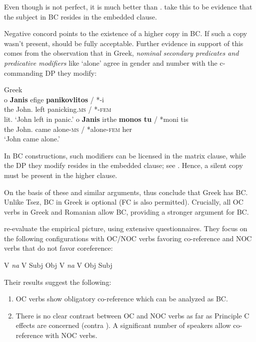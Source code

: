 \documentclass[output=paper]{langsci/langscibook}
\begin{document}
Even though  is not perfect, it is much better than . \citet{Alexiadou2010} take this to be evidence that the subject in BC resides in the embedded clause. 

Negative concord points to the existence of a higher copy in BC. If such a copy wasn’t present,  should be fully acceptable. Further evidence in support of this comes from the observation that in Greek, \textit{nominal secondary predicates and predicative modifiers} like ‘alone’ agree in gender and number with the c-commanding DP they modify:\pagebreak

\ea%
    \label{ex:alexiadou:13}
    Greek\\
\ea \gll  o    \textbf{Janis}        efige  \textbf{panikovlitos} / *-i      \\
             the John.{\NOM}  left    panicking.\textsc{ms} / *-\textsc{fem}\\ 
    \glt        lit. ‘John left in panic.’
\ex \gll o    \textbf{Janis}         irthe   \textbf{monos tu} / *moni tis\\
               the John.{\NOM}  came   alone-\textsc{ms} / *alone-\textsc{fem} her\\
    \glt       ‘John came alone.’  
    \z
\z

In BC constructions, such modifiers can be licensed in the matrix clause, while the DP they modify resides in the embedded clause; see \citet[103--104, examples (36--38)]{Alexiadou2010}. Hence, a silent copy must be present in the higher clause. 

On the basis of these and similar arguments, \citet{Alexiadou2010} thus conclude that Greek has BC. Unlike Tsez, BC in Greek is optional (FC is also permitted). Crucially, all OC verbs in Greek and Romanian allow BC, providing a stronger argument for BC.

\citet{Tsakali2017} re-evaluate the empirical picture, using extensive questionnaires. They focus on the following configurations with OC\slash NOC verbs favoring co-reference and NOC verbs that do not favor coreference:


\ea%
    \label{ex:alexiadou:14}
    \ea V \textit{na} V Subj Obj
    \ex V \textit{na} V Obj Subj
    \z
\z

Their results suggest the following:

\begin{enumerate}
\item OC verbs show obligatory co-reference which can be analyzed as BC.
\item There is no clear contrast between OC and NOC verbs as far as Principle C effects are concerned (contra \citealt{Alexiadou2010}). A significant number of speakers allow co-reference with NOC verbs. 
\end{enumerate}
\end{document}
